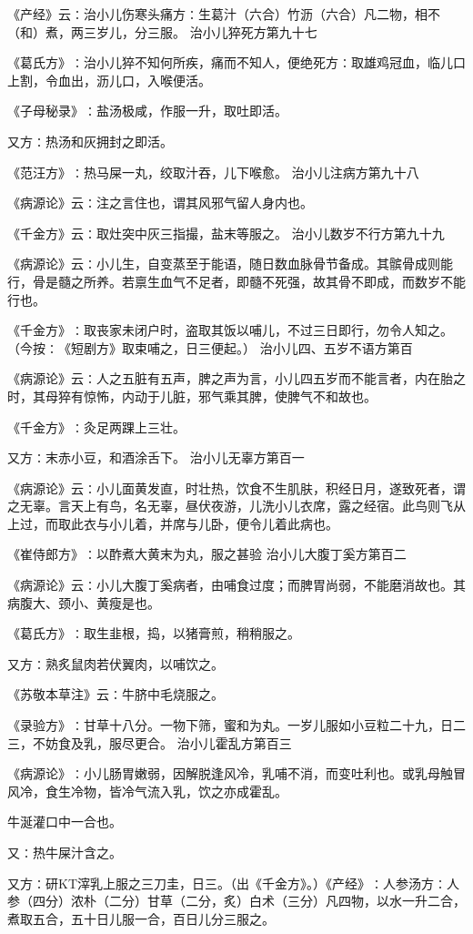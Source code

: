 \documentclass[a4paper,12pt,UTF8,twoside]{ctexbook}
\begin{document}
《产经》云∶治小儿伤寒头痛方∶生葛汁（六合）竹沥（六合）凡二物，相不（和）煮，两三岁儿，分三服。
治小儿猝死方第九十七

《葛氏方》∶治小儿猝不知何所疾，痛而不知人，便绝死方∶取雄鸡冠血，临儿口上割，令血出，沥儿口，入喉便活。

《子母秘录》∶盐汤极咸，作服一升，取吐即活。

又方∶热汤和灰拥封之即活。

《范汪方》∶热马屎一丸，绞取汁吞，儿下喉愈。
治小儿注病方第九十八

《病源论》云∶注之言住也，谓其风邪气留人身内也。

《千金方》云∶取灶突中灰三指撮，盐末等服之。
治小儿数岁不行方第九十九

《病源论》云∶小儿生，自变蒸至于能语，随日数血脉骨节备成。其髌骨成则能行，骨是髓之所养。若禀生血气不足者，即髓不死强，故其骨不即成，而数岁不能行也。

《千金方》∶取丧家未闭户时，盗取其饭以哺儿，不过三日即行，勿令人知之。（今按∶《短剧方》取束哺之，日三便起。）
治小儿四、五岁不语方第百

《病源论》云∶人之五脏有五声，脾之声为言，小儿四五岁而不能言者，内在胎之时，其母猝有惊怖，内动于儿脏，邪气乘其脾，使脾气不和故也。

《千金方》∶灸足两踝上三壮。

又方∶末赤小豆，和酒涂舌下。
治小儿无辜方第百一

《病源论》云∶小儿面黄发直，时壮热，饮食不生肌肤，积经日月，遂致死者，谓之无辜。言天上有鸟，名无辜，昼伏夜游，儿洗小儿衣席，露之经宿。此鸟则飞从上过，而取此衣与小儿着，并席与儿卧，便令儿着此病也。

《崔侍郎方》∶以酢煮大黄末为丸，服之甚验
治小儿大腹丁奚方第百二

《病源论》云∶小儿大腹丁奚病者，由哺食过度；而脾胃尚弱，不能磨消故也。其病腹大、颈小、黄瘦是也。

《葛氏方》∶取生韭根，捣，以猪膏煎，稍稍服之。

又方∶熟炙鼠肉若伏翼肉，以哺饮之。

《苏敬本草注》云∶牛脐中毛烧服之。

《录验方》∶甘草十八分。一物下筛，蜜和为丸。一岁儿服如小豆粒二十九，日二三，不妨食及乳，服尽更合。
治小儿霍乱方第百三

《病源论》∶小儿肠胃嫩弱，因解脱逢风冷，乳哺不消，而变吐利也。或乳母触冒风冷，食生冷物，皆冷气流入乳，饮之亦成霍乱。

牛涎灌口中一合也。

又∶热牛屎汁含之。

又方∶研KT滓乳上服之三刀圭，日三。（出《千金方》。）《产经》∶人参汤方∶人参（四分）浓朴（二分）甘草（二分，炙）白术（三分）凡四物，以水一升二合，煮取五合，五十日儿服一合，百日儿分三服之。
\end{document}
